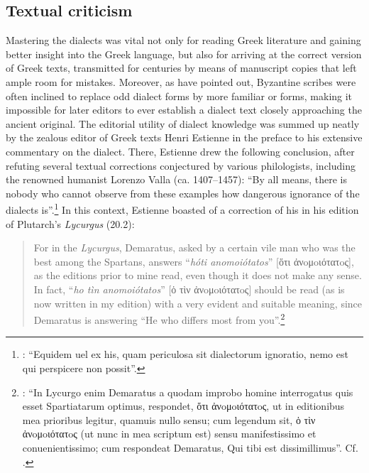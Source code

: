 \subsection{Textual criticism}

Mastering the dialects was vital not only for reading Greek literature and gaining better insight into the Greek language, but also for arriving at the correct version of Greek texts, transmitted for centuries by means of manuscript copies that left ample room for mistakes. Moreover, as \citet[47--48]{Reynolds1991} have pointed out, Byzantine scribes were often inclined to replace odd dialect forms by more familiar  or  forms, making it impossible for later editors to ever establish a dialect text closely approaching the ancient original. The editorial utility of dialect knowledge was summed up neatly by the zealous editor of Greek texts Henri Estienne in the preface to his extensive commentary on the  dialect. There, Estienne drew the following conclusion, after refuting several textual corrections conjectured by various philologists, including the renowned  humanist Lorenzo Valla (ca. 1407–1457): “By all means, there is nobody who cannot observe from these examples how dangerous ignorance of the dialects is”.\footnote{\citet[¶.iii\textsc{\textsuperscript{v}}]{Estienne1573}: “Equidem uel ex his, quam periculosa sit dialectorum ignoratio, nemo est qui perspicere non possit”.} In this context, Estienne boasted of a correction of his in his edition of Plutarch’s \textit{Lycurgus} (20.2):

\begin{quote}
For in the \textit{Lycurgus}, Demaratus, asked by a certain vile man who was the best among the Spartans, answers “\textit{hóti anomoiótatos}” [ὅτι ἀνoμoιότατoς], as the editions prior to mine read, even though it does not make any sense. In fact, “\textit{ho tìn anomoiótatos}” [ὁ τὶν ἀνoμoιότατoς] should be read (as is now written in my edition) with a very evident and suitable meaning, since Demaratus is answering “He who differs most from you”.\footnote{\citet[¶.iii\textsc{\textsuperscript{v}}]{Estienne1573}: “In Lycurgo enim Demaratus a quodam improbo homine interrogatus quis esset Spartiatarum optimus, respondet, ὅτι ἀνoμoιότατoς, ut in editionibus mea prioribus legitur, quamuis nullo sensu; cum legendum sit, ὁ τὶν ἀνoμoιότατoς (ut nunc in mea scriptum est) sensu manifestissimo et conuenientissimo; cum respondeat Demaratus, Qui tibi est dissimillimus”. Cf. \citet[36, 43–44]{Estienne1581}.}
\end{quote}

